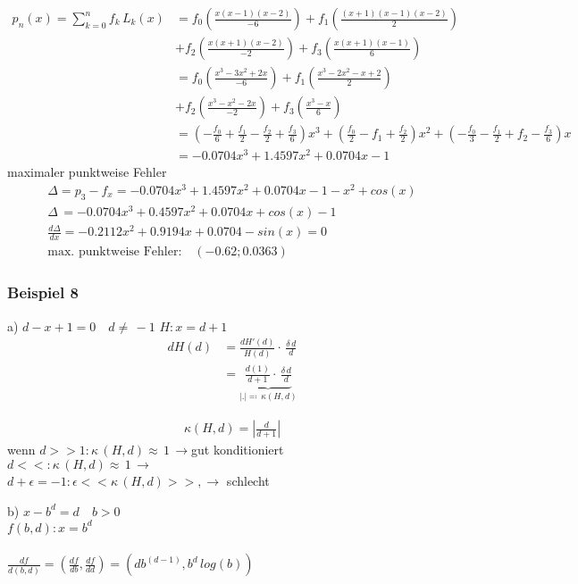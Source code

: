 \begin{align*}
p_n(x)=\sum\limits_{k=0}^{n}{f_k\,L_k(x)}&=f_0\left(\frac{x(x-1)(x-2)}{-6}\right)+f_1\left(\frac{(x+1)(x-1)(x-2)}{2}\right)\\&+f_2\left(\frac{x(x+1)(x-2)}{-2}\right)+f_3\left(\frac{x(x+1)(x-1)}{6}\right)\\
&=f_0\left(\frac{x^3-3x^2+2x}{-6}\right)+f_1\left(\frac{x^3-2x^2-x+2}{2}\right)\\&+f_2\left(\frac{x^3-x^2-2x}{-2}\right)+f_3\left(\frac{x^3-x}{6}\right)\\
&=\left(-\frac{f_0}{6}+\frac{f_1}{2}-\frac{f_2}{2}+\frac{f_3}{6}\right)x^3+\left(\frac{f_0}{2}-f_1+\frac{f_2}{2}\right)x^2+\left(-\frac{f_0}{3}-\frac{f_1}{2}+f_2-\frac{f_3}{6}\right)x\\
&=-0.0704x^3+1.4597x^2+0.0704x-1
\end{align*}
maximaler punktweise Fehler\\
\begin{align*}
\Delta=p_3 - f_x = -0.0704x^3+1.4597x^2+0.0704x-1 -x^2 + cos(x)\\
\Delta\,=-0.0704x^3+0.4597x^2+0.0704x+cos(x)-1\\
\frac{d\Delta}{dx}=-0.2112x^2+0.9194x+0.0704-sin(x) = 0\\
\text{max. punktweise Fehler:} \quad (-0.62;0.0363)
\end{align*}

\subsubsection{Beispiel 8}
a) $d-x+1=0 \quad d\neq\,-1$
$H: x = d+1$
\begin{align*}
dH(d)&= \frac{dH'(d)}{H(d)}\cdot\,\frac{\delta\,d}{d}\\
 &= \underbrace{\frac{d(1)}{d+1}\cdot\,\frac{\delta\,d}{d}}_{|.|\eqqcolon\,\kappa(H,d)}
\end{align*}

\begin{align*}
\kappa(H,d)=\left|\frac{d}{d+1}\right|
\end{align*}
wenn $d>>1: \kappa\,(H,d)\approx\,1\,\rightarrow$gut konditioniert \\
 $d<<: \kappa\,(H,d)\approx\,1\,\rightarrow$ \\
 $d+\epsilon=-1:\epsilon << \kappa\,(H,d)>>,\rightarrow$ schlecht \\


b) $x-b^d=d\quad b>0$\\
$f(b,d): x = b^d$\\
\vspace{0.5cm}\\
$\frac{df}{d(b,d)}=\left(\frac{df}{db},\frac{df}{dd}\right)=(db^{(d-1)},b^d\,log(b))$

